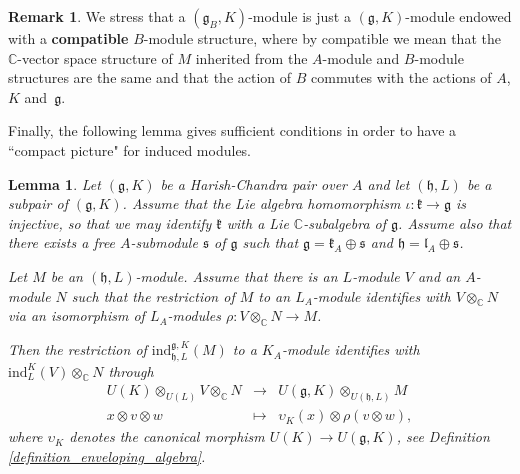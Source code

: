 \documentclass{amsart}
\newtheorem{lemma}[theorem]{Lemma}
\theoremstyle{definition}
\newtheorem{remark}[theorem]{Remark}
\begin{document}
\begin{remark}\label{compatible}
    We stress that a $(\mathfrak{g}_B, K)$-module is just a $(\mathfrak{g},K)$-module endowed with a \textbf{compatible} $B$-module structure, where by compatible we mean that the $\mathbb{C}$-vector space structure of $M$ inherited from the $A$-module and $B$-module structures are the same and that the action of $B$ commutes with the actions of $A$, $K$ and~$\mathfrak{g}$.
\end{remark}

Finally, the following lemma gives sufficient conditions in order to have a ``compact picture" for induced modules.

\begin{lemma}\label{lemma_compact_pic}
    Let $(\mathfrak{g},K)$ be a Harish-Chandra pair over $A$ and let $(\mathfrak{h},L)$ be a subpair of $(\mathfrak{g},K)$. Assume that the Lie algebra homomorphism $\iota :\mathfrak{k} \to \mathfrak{g}$ is injective, so that we may identify $\mathfrak{k}$ with a Lie $\mathbb{C}$-subalgebra of $\mathfrak{g}$. Assume also that there exists a free $A$-submodule $\mathfrak{s}$ of $\mathfrak{g}$ such that $\mathfrak{g} = \mathfrak{k}_A \oplus \mathfrak{s}$ and $\mathfrak{h} = \mathfrak{l}_A \oplus \mathfrak{s}$.
    
    Let $M$ be an $(\mathfrak{h},L)$-module. Assume that there is an $L$-module $V$ and an $A$-module $N$ such that the restriction of $M$ to an $L_A$-module identifies with $V \otimes_\mathbb{C}N$ via an isomorphism of $L_A$-modules $\rho : V \otimes_\mathbb{C}N \to M$.
    
    Then the restriction of $\mathrm{ind}_{\mathfrak{h},L}^{\mathfrak{g},K}(M)$ to a $K_A$-module identifies with $\mathrm{ind}_L^K(V) \otimes_\mathbb{C} N$ through
    \[\begin{array}{cccll}
         U(K) \otimes_{U(L)}V \otimes_\mathbb{C} N& \longrightarrow &U(\mathfrak{g},K) \otimes_{U(\mathfrak{h},L)}M  \\
         x \otimes v \otimes w& \longmapsto & \upsilon_K(x) \otimes \rho(v \otimes w), 
    \end{array}\]
    where $\upsilon_K$ denotes the canonical morphism $U(K) \to U(\mathfrak{g},K)$, see Definition \ref{definition_enveloping_algebra}.
\end{lemma}
\end{document}

